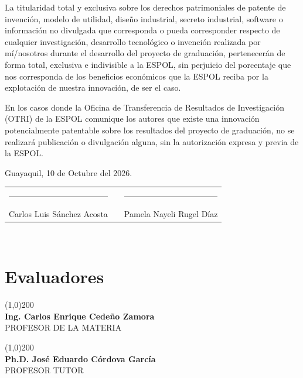 La titularidad total y exclusiva sobre los derechos patrimoniales de patente de invención, modelo de utilidad, diseño industrial, secreto industrial, software o información no divulgada que corresponda o pueda corresponder respecto de cualquier investigación, desarrollo tecnológico o invención realizada por mí/nosotros durante el desarrollo del proyecto de graduación, pertenecerán de forma total, exclusiva e indivisible a la ESPOL, sin perjuicio del porcentaje que nos corresponda de los beneficios económicos que la ESPOL reciba por la explotación de nuestra innovación, de ser el caso. 

En los casos donde la Oficina de Transferencia de Resultados de Investigación (OTRI) de la ESPOL comunique los autores que existe una innovación potencialmente patentable sobre los resultados del proyecto de graduación, no se realizará publicación o divulgación alguna, sin la autorización expresa y previa de la ESPOL. 

\vspace{1cm}

Guayaquil, 10 de Octubre del 2026.
\vspace{2.5cm}

\begin{table}[h!]
    \centering
    \begin{tabular}{ccc}
        \rule{6cm}{0.5pt} & \hspace{1.5cm} & \rule{6cm}{0.5pt} \\
        Carlos Luis Sánchez Acosta & & Pamela Nayeli Rugel Díaz \\
    \end{tabular}
\end{table}
        
$\ $
\thispagestyle{empty}


\chapter*{Evaluadores}
\thispagestyle{empty}
\vspace{15.0em}
\begin{minipage}{.45\linewidth}
    \begin{flushleft} 
    \end{flushleft}
    \line(1,0){200} \\ \centering \textbf{Ing. Carlos Enrique Cedeño Zamora} \\ PROFESOR DE LA MATERIA 
\end{minipage}
\hfill
\begin{minipage}{.45\linewidth}
    \begin{flushright}
    \end{flushright} 
    \line(1,0){200} \\ \centering \textbf{Ph.D. José Eduardo Córdova García} \\ PROFESOR TUTOR
\end{minipage}


$\ $
\thispagestyle{empty}